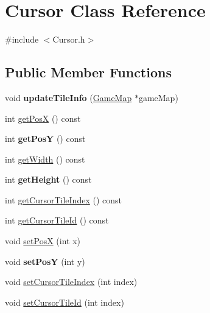 \hypertarget{class_cursor}{}\section{Cursor Class Reference}
\label{class_cursor}


{\ttfamily \#include $<$Cursor.\+h$>$}

\subsection*{Public Member Functions}
\begin{DoxyCompactItemize}
\item 
\hypertarget{class_cursor_ac6aea4b2b4a2a6161714177f946912f8}{}void {\bfseries update\+Tile\+Info} (\hyperlink{class_game_map}{Game\+Map} $\ast$game\+Map)\label{class_cursor_ac6aea4b2b4a2a6161714177f946912f8}

\item 
int \hyperlink{class_cursor_a48601bc1add8c98130e4ab06dd64612e}{get\+Pos\+X} () const 
\item 
\hypertarget{class_cursor_a544d547307359cf5756695731c5b9cee}{}int {\bfseries get\+Pos\+Y} () const \label{class_cursor_a544d547307359cf5756695731c5b9cee}

\item 
int \hyperlink{class_cursor_a042c734fb8cbf2e25caf35fb464672ee}{get\+Width} () const 
\item 
\hypertarget{class_cursor_aae2b2a4bf603eea6db6d251c2860a697}{}int {\bfseries get\+Height} () const \label{class_cursor_aae2b2a4bf603eea6db6d251c2860a697}

\item 
int \hyperlink{class_cursor_a64f0af5ad4d61b7538eb8cf4cc9772db}{get\+Cursor\+Tile\+Index} () const 
\item 
int \hyperlink{class_cursor_a0ab2df178de6fe9004df0a544f2b362d}{get\+Cursor\+Tile\+Id} () const 
\item 
void \hyperlink{class_cursor_a5183d34de8df425d11181d321161cad3}{set\+Pos\+X} (int x)
\item 
\hypertarget{class_cursor_a96feb857d5a4bee5823d364f8d3f8781}{}void {\bfseries set\+Pos\+Y} (int y)\label{class_cursor_a96feb857d5a4bee5823d364f8d3f8781}

\item 
void \hyperlink{class_cursor_a792ae0f117bffa4ed7290240e12aa3f2}{set\+Cursor\+Tile\+Index} (int index)
\item 
void \hyperlink{class_cursor_a4e8701b1e4bf1670ffce00105f257e99}{set\+Cursor\+Tile\+Id} (int index)
\end{DoxyCompactItemize}


